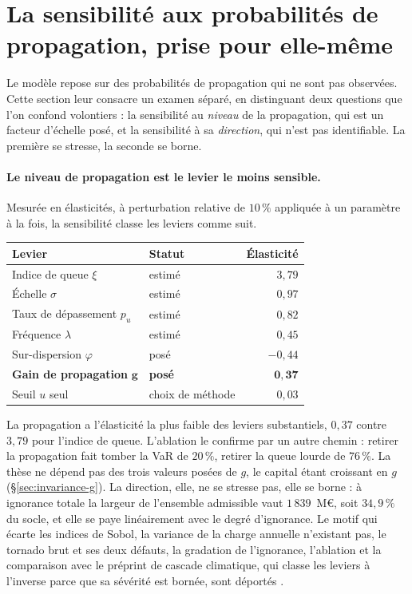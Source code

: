 \section{La sensibilité aux probabilités de propagation, prise pour elle-même}
\label{sec:sensibilite-propagation}


Le modèle repose sur des probabilités de propagation qui ne sont pas observées. Cette section
leur consacre un examen séparé, en
distinguant deux questions que l'on confond volontiers : la sensibilité au \emph{niveau} de la
propagation, qui est un facteur d'échelle posé, et la sensibilité à sa \emph{direction}, qui
n'est pas identifiable. La première se stresse, la seconde se borne.

\paragraph{Le niveau de propagation est le levier le moins sensible.} Mesurée en élasticités, à
perturbation relative de $10\,\%$ appliquée à un paramètre à la fois, la sensibilité classe les
leviers comme suit.

\begin{center}\footnotesize
\renewcommand{\arraystretch}{1.15}
\begin{tabular}{@{}l l r@{}}
\toprule
\textbf{Levier} & \textbf{Statut} & \textbf{Élasticité} \\
\midrule
Indice de queue $\xi$ & estimé & $3{,}79$ \\
Échelle $\sigma$ & estimé & $0{,}97$ \\
Taux de dépassement $p_u$ & estimé & $0{,}82$ \\
Fréquence $\lambda$ & estimé & $0{,}45$ \\
Sur-dispersion $\varphi$ & posé & $-0{,}44$ \\
\textbf{Gain de propagation} $\boldsymbol{g}$ & \textbf{posé} & $\mathbf{0{,}37}$ \\
Seuil $u$ seul & choix de méthode & $0{,}03$ \\
\bottomrule
\end{tabular}
\end{center}

\vspace{4pt}
\noindent La propagation a l'élasticité la plus faible des leviers substantiels, $0{,}37$ contre
$3{,}79$ pour l'indice de queue. L'ablation le confirme par un autre chemin : retirer la
propagation fait tomber la VaR de $20\,\%$, retirer la queue lourde de $76\,\%$. La thèse ne
dépend pas des trois valeurs posées de $g$, le capital étant croissant en $g$
(\S\ref{sec:invariance-g}). La direction, elle, ne se stresse pas, elle se borne : à ignorance
totale la largeur de l'ensemble admissible vaut $1\,839$~M\euro, soit $34{,}9\,\%$ du socle, et
elle se paye linéairement avec le degré d'ignorance. Le motif qui écarte les indices de Sobol, la
variance de la charge annuelle n'existant pas, le tornado brut et ses deux défauts, la gradation
de l'ignorance, l'ablation et la comparaison avec le préprint de cascade climatique, qui classe
les leviers à l'inverse parce que sa sévérité est bornée, sont déportés
\matcomp.

